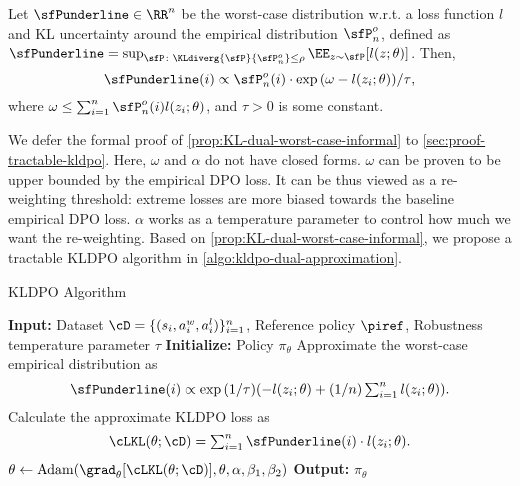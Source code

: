 \begin{proposition}\label{prop:KL-dual-worst-case-informal}
    Let  $\sfPunderline\in\RR^n$ be the worst-case distribution  w.r.t. a loss function  $l$ and KL uncertainty around the empirical distribution $\sfP_n^o$, defined as $\sfPunderline = \sup_{\sfP\colon\KLdiverg{\sfP}{\sfP_n^o}\leq \rho} \EE_{z\sim\sfP} [l(z;\theta)]$. Then, 
    \begin{equation}
        \sfPunderline(i) \propto \sfP_n^o(i) \cdot \exp{(\omega - l(z_i;\theta))/\tau},
    \end{equation}
    where $\omega\leq \sum_{i=1}^n \sfP_n^o(i) l(z_i;\theta)$, and $\tau>0$ is some constant.
\end{proposition}
We defer the formal proof of \cref{prop:KL-dual-worst-case-informal} to \cref{sec:proof-tractable-kldpo}. Here, $\omega$ and $\alpha$ do not have closed forms. $\omega$ can be proven to be upper bounded by the empirical DPO loss. It can be thus viewed as a re-weighting threshold: extreme losses are more biased towards the baseline empirical DPO loss. $\alpha$ works as a temperature parameter to control how much we want the re-weighting. Based on \cref{prop:KL-dual-worst-case-informal}, we propose a tractable KLDPO algorithm in \cref{algo:kldpo-dual-approximation}. 
\begin{algorithm}[ht]
	\caption{KLDPO Algorithm}	
	\begin{algorithmic}[1]\label{algo:kldpo-dual-approximation}
	\STATE \textbf{Input:} Dataset $\cD=\{(s_i,a^w_i,a^l_i)\}_{i=1}^n$, Reference policy $\piref$, Robustness temperature parameter $\tau$
		\STATE \textbf{Initialize:} Policy $\pi_\theta$
        \STATE Approximate the worst-case empirical distribution as
    \begin{equation*}
        \sfPunderline(i) \propto \exp{(1/\tau)(-l(z_i;\theta) + (1/n)\textstyle\sum\nolimits_{i=1}^n l(z_i;\theta)  )}.
    \end{equation*}
        \STATE Calculate the approximate KLDPO loss as
        \begin{equation*}
            \cLKL(\theta;\cD) = \textstyle\sum\nolimits_{i=1}^n \sfPunderline(i)\cdot l(z_i;\theta).
        \end{equation*}
  \STATE $\theta \leftarrow \mathrm{Adam}(\grad_\theta [\cLKL(\theta;\cD)], \theta,\alpha,\beta_1,\beta_2)$
		\ENDWHILE
		\STATE \textbf{Output:} $\pi_\theta$
	\end{algorithmic}
\end{algorithm}

